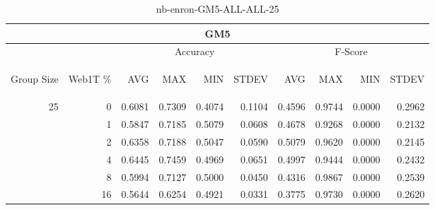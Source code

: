 \begin{center}
\begin{table}[htbp]
\begin{tabular}{ | r | r | r | r | r | r | r | r | r | r |}
\hline
\multicolumn{10}{|c|}{GM5}\\
\hline
 & & \multicolumn{4}{|c|}{Accuracy} & \multicolumn{4}{|c|}{F-Score}\\ \cline{3-10}
\begin{sideways}Group Size\end{sideways} & \begin{sideways}Web1T \%\end{sideways} & \begin{sideways}AVG\end{sideways} & \begin{sideways}MAX\end{sideways} & \begin{sideways}MIN\end{sideways} & \begin{sideways}STDEV\end{sideways} & \begin{sideways}AVG\end{sideways} & \begin{sideways}MAX\end{sideways} & \begin{sideways}MIN\end{sideways} & \begin{sideways}STDEV\end{sideways}\\
\hline
\multirow{6}{*}{25}
 & 0 & 0.6081 & 0.7309 & 0.4074 & 0.1104 & 0.4596 & 0.9744 & 0.0000 & 0.2962\\ \cline{2-10}
 & 1 & 0.5847 & 0.7185 & 0.5079 & 0.0608 & 0.4678 & 0.9268 & 0.0000 & 0.2132\\ \cline{2-10}
 & 2 & 0.6358 & 0.7188 & 0.5047 & 0.0590 & 0.5079 & 0.9620 & 0.0000 & 0.2145\\ \cline{2-10}
 & 4 & 0.6445 & 0.7459 & 0.4969 & 0.0651 & 0.4997 & 0.9444 & 0.0000 & 0.2432\\ \cline{2-10}
 & 8 & 0.5994 & 0.7127 & 0.5000 & 0.0450 & 0.4316 & 0.9867 & 0.0000 & 0.2539\\ \cline{2-10}
 & 16 & 0.5644 & 0.6254 & 0.4921 & 0.0331 & 0.3775 & 0.9730 & 0.0000 & 0.2620\\ \cline{2-10}
\hline
\end{tabular}
\caption{nb-enron-GM5-ALL-ALL-25}
\end{table}
\end{center}

